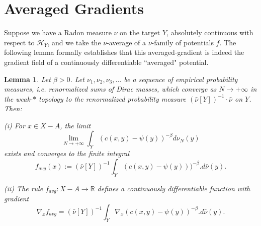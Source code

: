 \documentclass[12pt]{amsart}
\newtheorem{lem}{Lemma}
\theoremstyle{definition}
\theoremstyle{remark}
\newcommand{\bR}{\mathbb{R}}
\begin{document}


















\section{Averaged Gradients} 
Suppose we have a Radon measure $\nu$ on the target $Y$, absolutely continuous with respect to $\mathscr{H}_Y$, and we take the $\nu$-average of a $\nu$-family of potentials $f$. The following lemma formally establishes that this averaged-gradient is indeed the gradient field of a continuously differentiable ``averaged" potential. 

\begin{lem}\label{avgpot} 
Let $\beta>0$. Let $\nu_1, \nu_2, \nu_3, \ldots$ be a sequence of empirical probability measures, i.e. renormalized sums of Dirac masses, which converge as $N\to +\infty$ in the weak-$*$ topology to the renormalized probability measure $(\bar{\nu}[Y])^{-1} \cdot \bar{\nu}$ on $Y$. Then:

(i) For $x\in X-A$, the limit \begin{equation}\label{limit}\lim_{N\to +\infty}  \int_Y (c(x,y) -\psi(y))^{-\beta} d\nu_N(y)\end{equation} exists and converges to the finite integral \begin{equation}\label{favg} f_{avg}(x):=(\bar{\nu}[Y])^{-1} \int_Y (c(x,y)-\psi(y)))^{-\beta}. d\bar{\nu}(y).\end{equation} 

(ii) The rule $f_{avg}: X-A \to \bR$ defines a continuously differentiable function with gradient $$\nabla_x f_{avg}=(\bar{\nu}[Y])^{-1} \int _Y \nabla_x (c(x,y)-\psi(y))^{-\beta}.d\bar{\nu}(y).$$ 
\end{lem}
\end{document}
